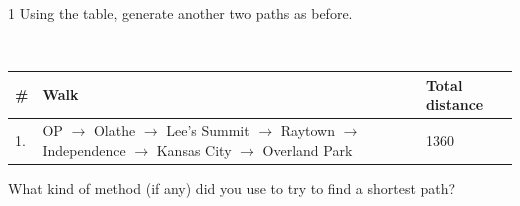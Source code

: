 \documentclass[a4paper,12pt]{book}
\newcounter{question}
\begin{document}
\hrulefill

\begin{question}{\thequestion}{1}
    Using the table, generate another two paths as before.

    
    ~\\
    \begin{tabular}{ | l | p{9cm} | l |}
        \hline
        \# & Walk & Total distance
        \\ \hline
        1. & OP $\to$ Olathe $\to$ Lee's Summit $\to$ Raytown $\to$ Independence $\to$ Kansas City $\to$ Overland Park & 1360
        \\ \hline
    \end{tabular}

    \vspace{5cm}
    What kind of method (if any) did you use to try to find a shortest path?
    
\end{question}
\end{document}
